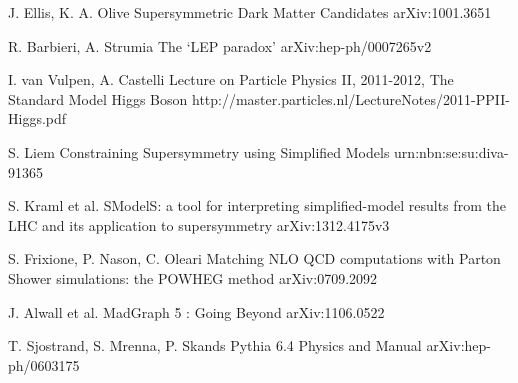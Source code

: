 
\begin{thebibliography}{2}
   
             {J. Ellis, K. A. Olive}
             {Supersymmetric Dark Matter Candidates}
             {arXiv:1001.3651}


             {R. Barbieri, A. Strumia}
             {The `LEP paradox'}
             {arXiv:hep-ph/0007265v2}

             {I. van Vulpen, A. Castelli}
             {Lecture on Particle Physics II, 2011-2012, The Standard Model Higgs Boson}
             {http://master.particles.nl/LectureNotes/2011-PPII-Higgs.pdf}




             {S. Liem}
             {Constraining Supersymmetry using Simplified Models}
             {urn:nbn:se:su:diva-91365}

             {S. Kraml et al.}
             {SModelS: a tool for interpreting simplified-model results from the LHC and its application to supersymmetry}
             {arXiv:1312.4175v3}


             {S. Frixione, P. Nason, C. Oleari}
             {Matching NLO QCD computations with Parton Shower simulations: the POWHEG method}
             {arXiv:0709.2092}

             {J. Alwall et al.}
             {MadGraph 5 : Going Beyond}
             {arXiv:1106.0522}

             {T. Sjostrand, S. Mrenna, P. Skands}
             {Pythia 6.4 Physics and Manual}
             {arXiv:hep-ph/0603175}


\end{thebibliography}
